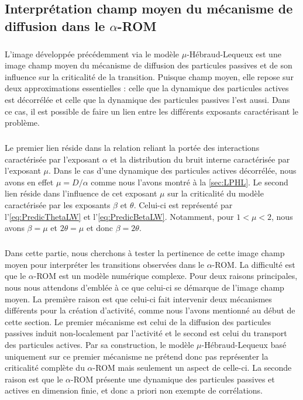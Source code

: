 \subsection{Interprétation champ moyen du mécanisme de diffusion dans le $\alpha$-ROM}

\subparagraph{}L'image développée précédemment via le modèle $\mu$-Hébraud-Lequeux est une image champ moyen du mécanisme de diffusion des particules passives et de son influence sur la criticalité de la transition. Puisque champ moyen, elle repose sur deux approximations essentielles : celle que la dynamique des particules actives est décorrélée et celle que la dynamique des particules passives l'est aussi. Dans ce cas, il est possible de faire un lien entre les différents exposants caractérisant le problème.

\subparagraph{}Le premier lien réside dans la relation reliant la portée des interactions caractérisée par l'exposant $\alpha$ et la distribution du bruit interne caractérisée par l'exposant $\mu$. Dans le cas d'une dynamique des particules actives décorrélée, nous avons en effet $\mu = D/\alpha$ comme nous l'avons montré à la \autoref{sec:LPHL}. Le second lien réside dans l'influence de cet exposant $\mu$ sur la criticalité du modèle caractérisée par les exposants $\beta$ et $\theta$. Celui-ci est représenté par l'\autoref{eq:PredicThetaLW} et l'\autoref{eq:PredicBetaLW}. Notamment, pour $1<\mu<2$, nous avons $\beta = \mu$ et $2\theta = \mu$ et donc $\beta = 2\theta$. 

\subparagraph{}Dans cette partie, nous cherchons à tester la pertinence de cette image champ moyen pour interpréter les transitions observées dans le $\alpha$-ROM. La difficulté est que le $\alpha$-ROM est un modèle numérique complexe. Pour deux raisons principales, nous nous attendons d'emblée à ce que celui-ci se démarque de l'image champ moyen. La première raison est que celui-ci fait intervenir deux mécanismes différents pour la création d'activité, comme nous l'avons mentionné au début de cette section. Le premier mécanisme est celui de la diffusion des particules passives induit non-localement par l'activité et le second est celui du transport des particules actives. Par sa construction, le modèle $\mu$-Hébraud-Lequeux basé uniquement sur ce premier mécanisme ne prétend donc pas représenter la criticalité complète du $\alpha$-ROM mais seulement un aspect de celle-ci. La seconde raison est que le $\alpha$-ROM présente une dynamique des particules passives et actives en dimension finie, et donc a priori non exempte de corrélations. 

